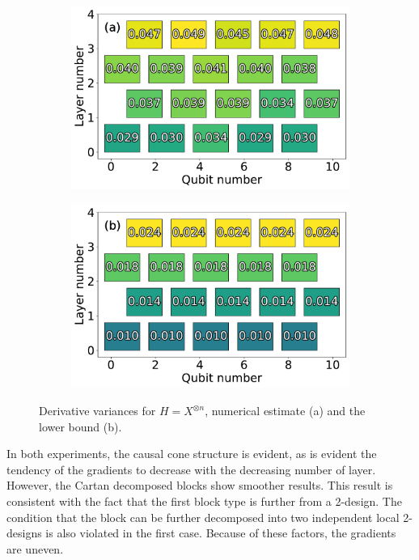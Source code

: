 \begin{figure}
    \centering
    \begin{subfigure}{.48\linewidth}
        \centering
        \includegraphics[width=\linewidth]{figures/dense_cartan.pdf}
    \end{subfigure}
    \begin{subfigure}{.48\linewidth}
        \centering
        \includegraphics[width=\linewidth]{figures/dense_theory.pdf}
    \end{subfigure}
    \caption{Derivative variances for $H = X^{\otimes n}$, numerical estimate (a) and the lower bound (b).}
    \label{fig:n-local}
\end{figure}

In both experiments, the causal cone structure is evident, as is evident the tendency of the gradients to decrease with the decreasing number of layer. However, the Cartan decomposed blocks show smoother results. This result is consistent with the fact that the first block type is further from a 2-design. The condition that the block can be further decomposed into two independent local 2-designs is also violated in the first case. Because of these factors, the gradients are uneven.

